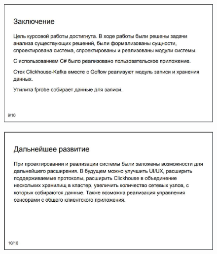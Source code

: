 \begin{figure}[H]
	\centering
	\includegraphics[scale=0.35]{pr9.jpg}
\end{figure}
\begin{figure}[H]
	\centering
	\includegraphics[scale=0.35]{pr10.jpg}
\end{figure}
